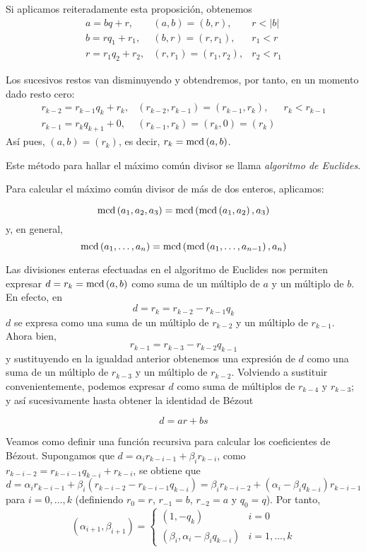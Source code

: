 Si aplicamos reiteradamente esta proposición, obtenemos
$$\begin{array}{lll}
    a = bq + r,       & (a,b)=(b,r),       & r<|b|   \\
    b = rq_1 + r_1,   & (b,r)=(r,r_1),     & r_1<r   \\
    r = r_1q_2 + r_2, & (r,r_1)=(r_1,r_2), & r_2<r_1
\end{array}$$

Los sucesivos restos van disminuyendo y obtendremos, por tanto, en un momento dado resto cero:
$$\begin{array}{lll}
    r_{k-2} = r_{k-1}q_k + r_k, & (r_{k-2},r_{k-1})=(r_{k-1},r_k),  & r_k<r_{k-1}   \\
    r_{k-1} = r_kq_{k+1} + 0,   & (r_{k-1},r_k)=(r_k,0)=(r_k)       & 
\end{array}$$
Así pues, $(a,b)=(r_k)$, es decir, $r_k=\operatorname{\rm mcd}\left(a,b\right)$.

Este método para hallar el máximo común divisor se llama {\it algoritmo de Euclides}.

Para calcular el máximo común divisor de más de dos enteros, aplicamos:

\begin{ejer}
    $$\operatorname{\rm mcd}\left(a_1,a_2,a_3\right)=\operatorname{\rm mcd}\left(\operatorname{\rm mcd}\left(a_1,a_2\right),a_3\right)$$
    y, en general,
    $$\operatorname{\rm mcd}\left(a_1,\dots,a_n\right)=\operatorname{\rm mcd}\left(\operatorname{\rm mcd}\left(a_1,\dots,a_{n-1}\right),a_n\right)$$
\end{ejer}

Las divisiones enteras efectuadas en el algoritmo de Euclides nos permiten expresar $d=r_k=\operatorname{\rm mcd}\left(a,b\right)$ como suma de un múltiplo de $a$ y un múltiplo de $b$. En efecto, en
$$d=r_k=r_{k-2}-r_{k-1}q_k$$
$d$ se expresa como una suma de un múltiplo de $r_{k-2}$ y un múltiplo de $r_{k-1}$. Ahora bien, 
$$r_{k-1}=r_{k-3}-r_{k-2}q_{k-1}$$
y sustituyendo en la igualdad anterior obtenemos una expresión de $d$ como una suma de un múltiplo de $r_{k-3}$ y un múltiplo de $r_{k-2}$. Volviendo a sustituir convenientemente, podemos expresar $d$ como suma de múltiplos de $r_{k-4}$ y $r_{k-3}$; y así sucesivamente hasta obtener la identidad de Bézout

$$d=ar+bs$$

\begin{reader}
    Veamos como definir una función recursiva para calcular los coeficientes de Bézout. Supongamos que $d=\alpha_i r_{k-i-1} + \beta_i r_{k-i}$, como $r_{k-i-2}=r_{k-i-1}q_{k-i}+r_{k-i}$, se obtiene que
    $$d=\alpha_i r_{k-i-1}+\beta_i(r_{k-i-2}-r_{k-i-1}q_{k-i})=\beta_i r_{k-i-2}+(\alpha_i -\beta_i q_{k-i})r_{k-i-1} $$
    para $i=0,\dots,k$ (definiendo $r_0=r$, $r_{-1}=b$, $r_{-2}=a$ y $q_0=q$). Por tanto,
    $$(\alpha_{i+1},\beta_{i+1})=\begin{cases}
        (1, -q_k) & i=0 \\
        (\beta_i, \alpha_i-\beta_iq_{k-i}) & i = 1,\dots,k
    \end{cases}$$
\end{reader}

